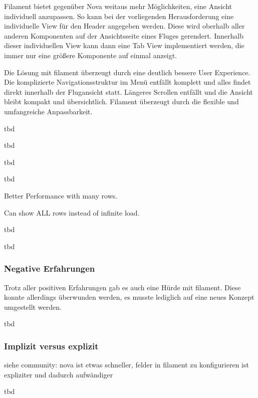 Filament bietet gegenüber Nova weitaus mehr Möglichkeiten, eine Ansicht individuell anzupassen.
So kann bei der vorliegenden Herausforderung eine individuelle View für den Header angegeben werden.
Diese wird oberhalb aller anderen Komponenten auf der Ansichtsseite eines Fluges gerendert.
Innerhalb dieser individuellen View kann dann eine Tab View implementiert werden, die immer nur eine größere Komponente auf einmal anzeigt.

Die Lösung mit filament überzeugt durch eine deutlich bessere User Experience.
Die komplizierte Navigationsstruktur im Menü entfällt komplett und alles findet direkt innerhalb der Flugansicht statt.
Längeres Scrollen entfällt und die Ansicht bleibt kompakt und übersichtlich.
Filament überzeugt durch die flexible und umfangreiche Anpassbarkeit.

tbd

tbd

tbd

tbd

Better Performance with many rows.

Can show ALL rows instead of infinite load.

tbd

tbd

\subsubsection{Negative Erfahrungen}
Trotz aller positiven Erfahrungen gab es auch eine Hürde mit filament.
Diese konnte allerdings überwunden werden, es musste lediglich auf eine neues Konzept umgestellt werden.

tbd

\subsubsection{Implizit versus explizit}
siehe community: nova ist etwas schneller, felder in filament zu konfigurieren ist expliziter und dadurch aufwändiger

tbd

